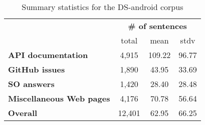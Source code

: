\begin{table}[!h]
\centering    
\begin{small}
\begin{threeparttable}
\begin{tabular}{lccc}





& \multicolumn{3}{c}{\textbf{\# of sentences}}
\\ \cmidrule(l){2-4} 
& total & mean & stdv  \\

\hline
\hline

\textbf{API documentation} 
& 4,915 & 109.22 & 96.77
\\
\textbf{GitHub issues} 
& 1,890 &  43.95 & 33.69
\\
\textbf{SO answers} 
& 1,420 & 28.40 & 28.48 
\\
\textbf{Miscellaneous Web pages} 
& 4,176 & 70.78 & 56.64 
\\

\hline
\hline
\textbf{Overall} 
& 12,401 & 62.95 & 66.25 
\\
\hline

\end{tabular}
\end{threeparttable}
\end{small}
\caption{Summary statistics for the \acs{DS-android} corpus}
\label{tbl:corpus-summary}
\end{table}

